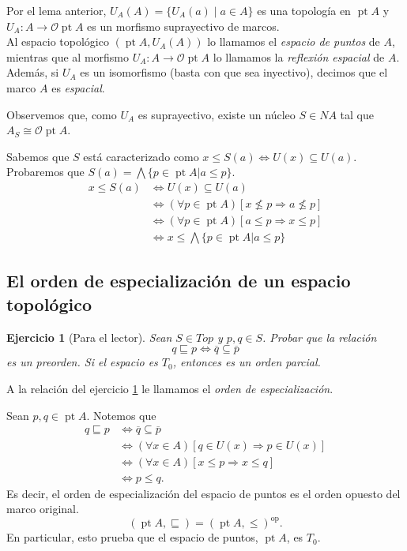 \documentclass[12pt,letterpaper,titlepage]{article}
\newtheorem{exe}{Ejercicio}
\theoremstyle{definition}
\newcommand\Inf{\bigwedge}
\renewcommand\cal[1]{\mathcal{#1}}
\newcommand\<{\langle}
\renewcommand\>{\rangle}
\newcommand{\op}{\mathrm{op}}
\DeclareMathOperator{\pt}{pt}
\begin{document}
Por el lema anterior, $U_A(A)=\{U_A(a)\mid a\in A\}$
es una topología en $\pt A$ y $U_A:A\to\cal O\pt A$ es un morfismo
suprayectivo de marcos.\\
Al espacio topológico $(\pt A,U_A(A))$ lo llamamos
el \textit{espacio de puntos} de $A$,
mientras que al morfismo $U_A\colon A\to \cal O\pt A$
lo llamamos la \textit{reflexión espacial} de $A$.
Además, si $U_A$ es un isomorfismo (basta con que sea inyectivo),
decimos que el marco $A$ es \textit{espacial}.

Observemos que, como $U_A$ es suprayectivo,
existe un núcleo $S\in NA$ tal que $A_S\cong \cal O\pt A$.\par
Sabemos que $S$ está caracterizado como $x\leq S(a) \iff U(x)\subseteq U(a)$. Probaremos que $S(a)=\Inf \{p\in \pt A|a\leq p\}$.
\begin{align*}
    x\leq S(a) &\iff U(x)\subseteq U(a)\\
    &\iff (\forall p\in \pt A)[x\not\leq p\Rightarrow a\not\leq p]\\
    &\iff (\forall p\in \pt A)[a\leq p \Rightarrow x\leq p]\\
    &\iff x\leq \Inf \{p\in \pt A|a\leq p\}
\end{align*}

\subsection{El orden de especialización de un espacio topológico}
\begin{exe}[Para el lector]%
    \label{exe:especializacion}
  Sean $S\in Top$ y $p,q\in S$. Probar que la relación
  \[q\sqsubseteq p\iff \overline{q}\subseteq \overline{p}\]
  es un preorden. Si el espacio es $T_0$, entonces es un orden parcial.
\end{exe}
A la relación del ejercicio \ref{exe:especializacion}
le llamamos el \textit{orden de especialización}.\par 
Sean $p,q\in \pt A$. Notemos que
\begin{align*}
    q\sqsubseteq p&\iff \overline{q}\subseteq \overline{p}\\
    &\iff (\forall x\in A)[q\in U(x)\Rightarrow p\in U(x)]\\
    &\iff (\forall x\in A)[x\leq p\Rightarrow x\leq q]\\
    &\iff p\leq q.
\end{align*}
Es decir, el orden de especialización del espacio de puntos es el orden opuesto del marco original.
\[
    (\pt A,\sqsubseteq) = (\pt A,\leq)^\op.
\]
En particular, esto prueba que el espacio de puntos, $\pt A$, es $T_0$.
\end{document}
